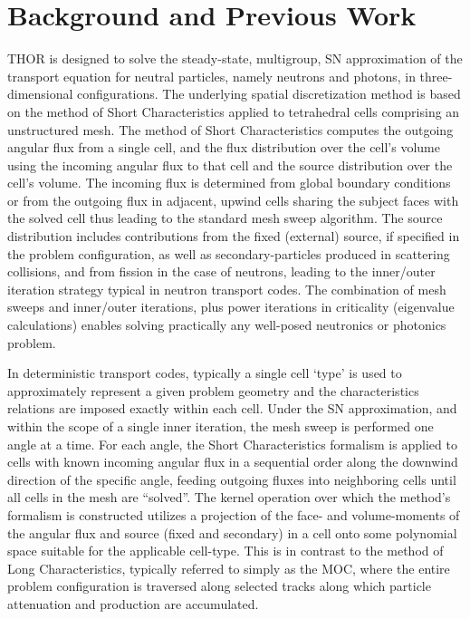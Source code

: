 \section{Background and Previous Work}

\ac{THOR} is designed to solve the steady-state, multigroup, \ac{SN} approximation of the transport equation for neutral particles, namely neutrons and photons, in three-dimensional configurations.
The underlying spatial discretization method is based on the method of Short Characteristics applied to tetrahedral cells comprising an unstructured mesh.
The method of Short Characteristics computes the outgoing angular flux from a single cell, and the flux distribution over the cell’s volume using the incoming angular flux to that cell and the source distribution over the cell’s volume.
The incoming flux is determined from global boundary conditions or from the outgoing flux in adjacent, upwind cells sharing the subject faces with the solved cell thus leading to the standard mesh sweep algorithm.
The source distribution includes contributions from the fixed (external) source, if specified in the problem configuration, as well as secondary-particles produced in scattering collisions, and from fission in the case of neutrons, leading to the inner/outer iteration strategy typical in neutron transport codes.
The combination of mesh sweeps and inner/outer iterations, plus power iterations in criticality (eigenvalue calculations) enables solving practically any well-posed neutronics or photonics problem.

In deterministic transport codes, typically a single cell ‘type’ is used to approximately represent a given problem geometry and the characteristics relations are imposed exactly within each cell.
Under the \ac{SN} approximation, and within the scope of a single inner iteration, the mesh sweep is performed one angle at a time.
For each angle, the Short Characteristics formalism is applied to cells with known incoming angular flux in a sequential order along the downwind direction of the specific angle, feeding outgoing fluxes into neighboring cells until all cells in the mesh are “solved”.
The kernel operation over which the method’s formalism is constructed utilizes a projection of the face- and volume-moments of the angular flux and source (fixed and secondary) in a cell onto some polynomial space suitable for the applicable cell-type.
This is in contrast to the method of Long Characteristics, typically referred to simply as the \ac{MOC}, where the entire problem configuration is traversed along selected tracks along which particle attenuation and production are accumulated.

